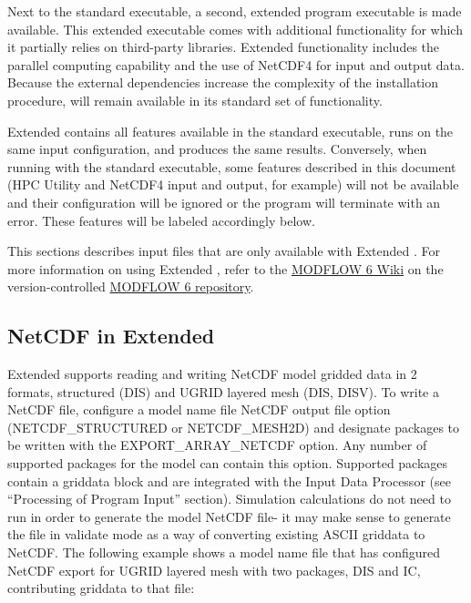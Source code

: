 Next to the standard \mf executable, a second, extended program executable is made available. This extended executable comes with additional functionality for which it partially relies on third-party libraries. Extended functionality includes the parallel computing capability and the use of NetCDF4 for input and output data. Because the external dependencies increase the complexity of the installation procedure, \mf will remain available in its standard set of functionality.

Extended \mf contains all features available in the standard executable, runs on the same input configuration, and produces the same results. Conversely, when running with the standard executable, some features described in this document (HPC Utility and NetCDF4 input and output, for example) will not be available and their configuration will be ignored or the program will terminate with an error. These features will be labeled accordingly below.

This sections describes input files that are only available with Extended \mf.  For more information on using Extended \mf, refer to the \href{https://github.com/MODFLOW-ORG/modflow6/wiki}{MODFLOW 6 Wiki} on the version-controlled \href{https://github.com/MODFLOW-ORG/modflow6}{MODFLOW 6 repository}.

\newpage
\subsection{NetCDF in Extended \mf}
Extended \mf supports reading and writing NetCDF model gridded data in 2 formats, structured (DIS) and UGRID layered mesh (DIS, DISV). To write a NetCDF file, configure a model name file NetCDF output file option (NETCDF\_STRUCTURED or NETCDF\_MESH2D) and designate packages to be written with the EXPORT\_ARRAY\_NETCDF option. Any number of supported packages for the model can contain this option. Supported packages contain a griddata block and are integrated with the Input Data Processor (see ``Processing of Program Input'' section). Simulation calculations do not need to run in order to generate the model NetCDF file- it may make sense to generate the file in \mf validate mode as a way of converting existing ASCII griddata to NetCDF. The following example shows a model name file that has configured NetCDF export for UGRID layered mesh with two packages, DIS and IC, contributing griddata to that file:


